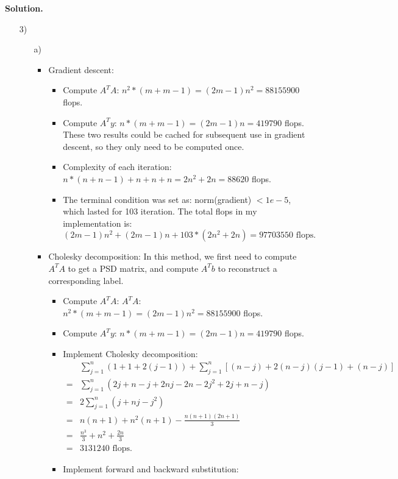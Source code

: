 \documentclass[english,onecolumn]{IEEEtran}
\begin{document}
\noindent
\textbf{Solution.}
\begin{enumerate}
	\item [3)]
	\begin{itemize}
	\item [a)]
		\begin{itemize}
			\item Gradient descent:
				\begin{itemize}
					\item Compute $A^TA$: $n^2*(m+m - 1) = (2m-1)n^2 = 88155900$ flops.
					\item Compute $A^Ty$: $n*(m+m-1) =(2m-1)n = 419790$ flops. \\
					These two results could be cached for subsequent use in gradient descent, so they only need to be computed once.
					\item Complexity of each iteration: $n * (n+n-1) + n +n +n = 2n^2+2n=88620$ flops. 
					\item The terminal condition was set as: norm(gradient) $< 1e-5$, which lasted for 103 iteration. The total flops in my implementation is: $$(2m-1)n^2 +(2m-1)n+103*(2n^2+2n) = 97703550 \,\,\text{flops.}$$ 
				\end{itemize}
			\item Cholesky decomposition: In this method, we first need to compute $A^TA$ to get a PSD matrix, and compute $A^Tb$ to reconstruct a corresponding label.
				\begin{itemize}
					\item Compute $A^TA$: $A^TA$: $n^2*(m+m - 1) = (2m-1)n^2 = 88155900$ flops.
					\item Compute $A^Ty$: $n*(m+m-1) =(2m-1)n = 419790$ flops.
					\item Implement Cholesky decomposition:
						\begin{align*}
							&\sum_{j=1}^n(1+1+2(j-1)) +\sum_{j=1}^n\left[(n-j) + 2(n-j)(j-1) + (n-j)\right]\\
						=&\sum_{j=1}^n\left(2j + n-j+2nj-2n-2j^2+2j+n-j\right)\\
						=&2\sum_{j=1}^n(j+nj-j^2)\\
						=&n(n+1) + n^2(n+1)-\frac{n(n+1)(2n+1)}{3}\\
						=&\frac{n^3}{3} + n^2+\frac{2n}{3}\\
						=&3131240 \,\,\text{flops}.
						\end{align*} 
					\item Implement forward and backward substitution:
						\begin{align*}

\end{align*}
\end{itemize}
\end{itemize}
\end{itemize}
\end{enumerate}
\end{document}
